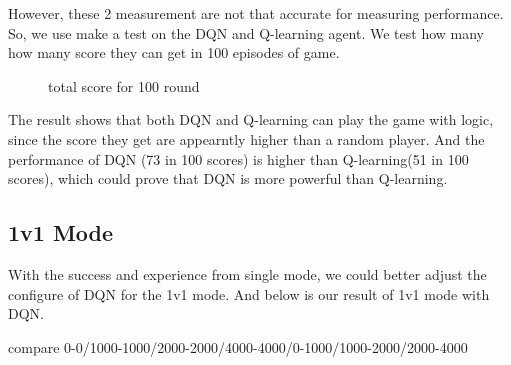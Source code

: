 \documentclass[12pt]{article}
\begin{document}
However, these 2 measurement are not that accurate for measuring performance. So, we use make a test on the DQN and Q-learning agent. We test how many how many score they can get in 100 episodes of game.

\begin{figure}[htbp]
	\centering
	\caption{total score for 100 round}
\end{figure}

 The result shows that both DQN and Q-learning can play the game with logic, since the score they get are appearntly higher than a random player. And the performance of DQN (73 in 100 scores) is higher than Q-learning(51 in 100 scores), which could prove that DQN is more powerful than Q-learning.


\subsection{1v1 Mode}

With the success and experience from single mode, we could better adjust the configure of DQN for the 1v1 mode. And below is our result of 1v1 mode with DQN.

compare 0-0/1000-1000/2000-2000/4000-4000/0-1000/1000-2000/2000-4000

\end{document}
